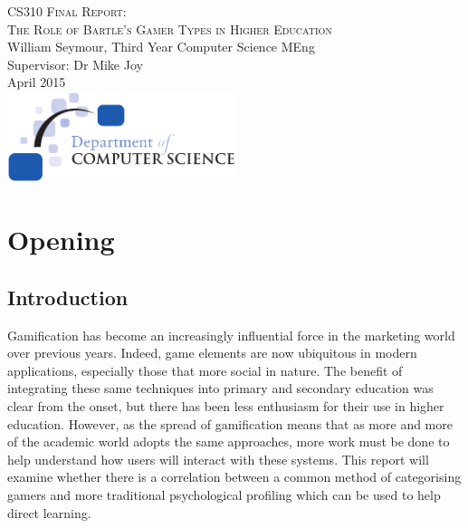 \documentclass[12pt,a4paper,twoside]{report}
\begin{document}
\begin{titlepage}
\begin{center}
\textsc{\LARGE CS310 Final Report:}\\[1.5cm]
\textsc{\LARGE The Role of Bartle's Gamer Types in Higher Education}\\
\vfill
\large{William Seymour, Third Year Computer Science MEng}\\[0.2cm]
\large{Supervisor: Dr Mike Joy}\\[0.7cm]
April 2015\\
\vfill
\includegraphics[width=0.50\textwidth]{../img/dcslogo.png}~\\[1cm]
\end{center}
\end{titlepage}

\tableofcontents
\listoffigures
\listoftables


\chapter{Opening}
\section{Introduction}
Gamification has become an increasingly influential force in the marketing world over previous years. Indeed, game elements are now ubiquitous in modern applications, especially those that more social in nature. The benefit of integrating these same techniques into primary and secondary education was clear from the onset, but there has been less enthusiasm for their use in higher education. However, as the spread of gamification means that as more and more of the academic world adopts the same approaches, more work must be done to help understand how users will interact with these systems. This report will examine whether there is a correlation between a common method of categorising gamers and more traditional psychological profiling which can be used to help direct learning.
\end{document}
